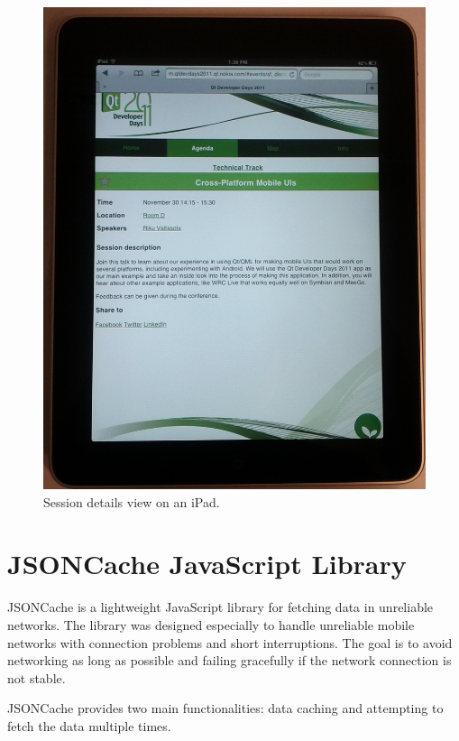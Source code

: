 \begin{figure}[h!]
  \begin{center}
    \includegraphics[width=\textwidth]{images/ipad-session.jpg}
    \caption{Session details view on an iPad.}
    \label{figure:ipad-session.jpg}
  \end{center}
\end{figure}

\section{JSONCache JavaScript Library}
\label{section:jsoncache}

JSONCache is a lightweight JavaScript library for fetching 
data in unreliable networks. The library was designed especially to
handle unreliable mobile networks with connection problems and short
interruptions. The goal is to avoid networking as long as possible and
failing gracefully if the network connection is not stable.

JSONCache provides two main functionalities: data caching and
attempting to fetch the data multiple times.

